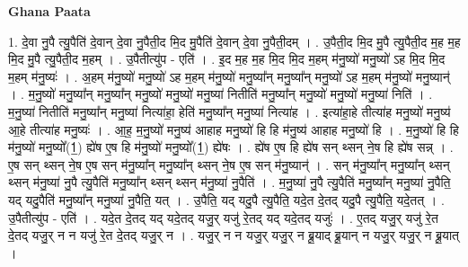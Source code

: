 \documentclass[17pt]{extarticle}
\begin{document}
\textbf{Ghana Paata } \newline

1. दे॒वा नु॒पै त्यु॒पैति॑ दे॒वान् दे॒वा नु॒पैती॒द मि॒द मु॒पैति॑ दे॒वान् दे॒वा नु॒पैती॒दम् । . उ॒पैती॒द मि॒द मु॒पै त्यु॒पैती॒द म॒ह म॒ह मि॒द मु॒पै त्यु॒पैती॒द म॒हम् । . उ॒पैतीत्यु॑प - एति॑ । . इ॒द म॒ह म॒ह मि॒द मि॒द म॒हम् म॑नु॒ष्यो॑ मनु॒ष्यो॑ ऽह मि॒द मि॒द म॒हम् म॑नु॒ष्यः॑ । . अ॒हम् म॑नु॒ष्यो॑ मनु॒ष्यो॑ ऽह म॒हम् म॑नु॒ष्यो॑ मनु॒ष्या᳚न् मनु॒ष्या᳚न् मनु॒ष्यो॑ ऽह म॒हम् म॑नु॒ष्यो॑ मनु॒ष्यान्॑ । . म॒नु॒ष्यो॑ मनु॒ष्या᳚न् मनु॒ष्या᳚न् मनु॒ष्यो॑ मनु॒ष्यो॑ मनु॒ष्या॑ नितीति॑ मनु॒ष्या᳚न् मनु॒ष्यो॑ मनु॒ष्यो॑ मनु॒ष्या॑ निति॑ । . म॒नु॒ष्या॑ नितीति॑ मनु॒ष्या᳚न् मनु॒ष्या॑ नित्या॑हा॒ हेति॑ मनु॒ष्या᳚न् मनु॒ष्या॑ नित्या॑ह । . इत्या॑हा॒हे तीत्या॑ह मनु॒ष्यो॑ मनु॒ष्य॑ आ॒हे तीत्या॑ह मनु॒ष्यः॑ । . आ॒ह॒ म॒नु॒ष्यो॑ मनु॒ष्य॑ आहाह मनु॒ष्यो॑ हि हि म॑नु॒ष्य॑ आहाह मनु॒ष्यो॑ हि । . म॒नु॒ष्यो॑ हि हि म॑नु॒ष्यो॑ मनु॒ष्यो᳚(1॒) ह्ये॑ष ए॒ष हि म॑नु॒ष्यो॑ मनु॒ष्यो᳚(1॒) ह्ये॑षः । . ह्ये॑ष ए॒ष हि ह्ये॑ष सन् थ्सन् ने॒ष हि ह्ये॑ष सन्न् । . ए॒ष सन् थ्सन् ने॒ष ए॒ष सन् म॑नु॒ष्या᳚न् मनु॒ष्या᳚न् थ्सन् ने॒ष ए॒ष सन् म॑नु॒ष्यान्॑ । . सन् म॑नु॒ष्या᳚न् मनु॒ष्या᳚न् थ्सन् थ्सन् म॑नु॒ष्या॑ नु॒पै त्यु॒पैति॑ मनु॒ष्या᳚न् थ्सन् थ्सन् म॑नु॒ष्या॑ नु॒पैति॑ । . म॒नु॒ष्या॑ नु॒पै त्यु॒पैति॑ मनु॒ष्या᳚न् मनु॒ष्या॑ नु॒पैति॒ यद् यदु॒पैति॑ मनु॒ष्या᳚न् मनु॒ष्या॑ नु॒पैति॒ यत् । . उ॒पैति॒ यद् यदु॒पै त्यु॒पैति॒ यदे॒त दे॒तद् यदु॒पै त्यु॒पैति॒ यदे॒तत् । . उ॒पैतीत्यु॑प - एति॑ । . यदे॒त दे॒तद् यद् यदे॒तद् यजु॒र् यजु॑ रे॒तद् यद् यदे॒तद् यजुः॑ । . ए॒तद् यजु॒र् यजु॑ रे॒त दे॒तद् यजु॒र् न न यजु॑ रे॒त दे॒तद् यजु॒र् न । . यजु॒र् न न यजु॒र् यजु॒र् न ब्रू॒याद् ब्रू॒यान् न यजु॒र् यजु॒र् न ब्रू॒यात् । \newline
\end{document}
